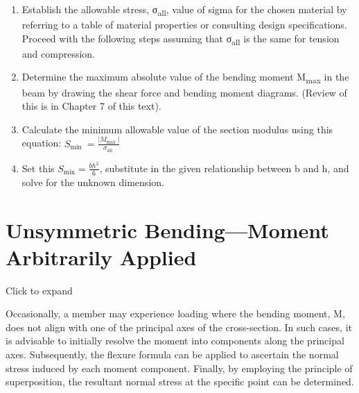 \documentclass[
  letterpaper,
  DIV=11,
  numbers=noendperiod]{scrreprt}
\providecommand{\tightlist}{%
  \setlength{\itemsep}{0pt}\setlength{\parskip}{0pt}}\usepackage{longtable,booktabs,array}
\begin{document}
\begin{tcolorbox}[enhanced jigsaw, colback=white, colframe=quarto-callout-note-color-frame, leftrule=.75mm, opacitybacktitle=0.6, colbacktitle=quarto-callout-note-color!10!white, arc=.35mm, bottomrule=.15mm, breakable, title={Step-by-step: Title?}, left=2mm, titlerule=0mm, toptitle=1mm, toprule=.15mm, opacityback=0, rightrule=.15mm, coltitle=black, bottomtitle=1mm]

\begin{enumerate}
\def\labelenumi{\arabic{enumi}.}
\tightlist
\item
  Establish the allowable stress, σ\textsubscript{all}, value of sigma
  for the chosen material by referring to a table of material properties
  or consulting design specifications. Proceed with the following steps
  assuming that σ\textsubscript{all} is the same for tension and
  compression.
\item
  Determine the maximum absolute value of the bending moment
  \textbar M\textsubscript{max}\textbar{} in the beam by drawing the
  shear force and bending moment diagrams. (Review of this is in Chapter
  7 of this text).
\item
  Calculate the minimum allowable value of the section modulus using
  this equation:
  \(S_{\text {min }}=\frac{\left|M_{\text {max }}\right|}{\sigma_{\text {all }}}\)
\item
  Set this \(S_{\min }=\frac{b h^2}{6}\), substitute in the given
  relationship between b and h, and solve for the unknown dimension.
\end{enumerate}

\end{tcolorbox}

\section{Unsymmetric Bending---Moment Arbitrarily
Applied}\label{unsymmetric-bendingmoment-arbitrarily-applied}

Click to expand

Occasionally, a member may experience loading where the bending moment,
M, does not align with one of the principal axes of the cross-section.
In such cases, it is advisable to initially resolve the moment into
components along the principal axes. Subsequently, the flexure formula
can be applied to ascertain the normal stress induced by each moment
component. Finally, by employing the principle of superposition, the
resultant normal stress at the specific point can be determined.
\end{document}
